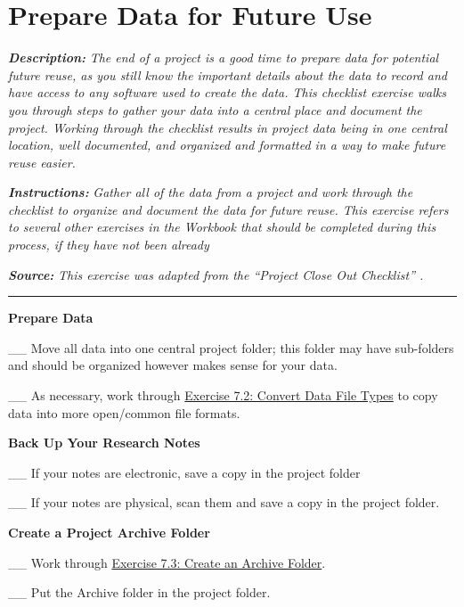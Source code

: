 \documentclass[
]{book}
\begin{document}
\newpage

\hypertarget{future-use}{%
\section{Prepare Data for Future Use}\label{future-use}}

\textbf{\emph{Description:}} \emph{The end of a project is a good time to prepare data for potential future reuse, as you still know the important details about the data to record and have access to any software used to create the data. This checklist exercise walks you through steps to gather your data into a central place and document the project. Working through the checklist results in project data being in one central location, well documented, and organized and formatted in a way to make future reuse easier.}

\textbf{\emph{Instructions:}} \emph{Gather all of the data from a project and work through the checklist to organize and document the data for future reuse. This exercise refers to several other exercises in the Workbook that should be completed during this process, if they have not been already}

\textbf{\emph{Source:}} \emph{This exercise was adapted from the ``Project Close Out Checklist'' \citep{briney_project_2020}.}

\begin{center}\rule{0.5\linewidth}{0.5pt}\end{center}

\textbf{Prepare Data}

\_\_ Move all data into one central project folder; this folder may have sub-folders and should be organized however makes sense for your data.

\_\_ As necessary, work through \protect\hyperlink{file-type}{Exercise 7.2: Convert Data File Types} to copy data into more open/common file formats.

\textbf{Back Up Your Research Notes}

\_\_ If your notes are electronic, save a copy in the project folder

\_\_ If your notes are physical, scan them and save a copy in the project folder.

\textbf{Create a Project Archive Folder}

\_\_ Work through \protect\hyperlink{archive-folder}{Exercise 7.3: Create an Archive Folder}.

\_\_ Put the Archive folder in the project folder.
\end{document}
